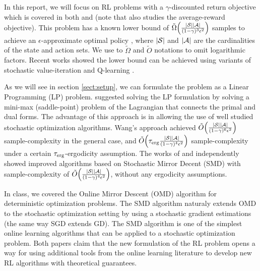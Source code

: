 \documentclass{article}
\DeclarePairedDelimiter\br{(}{)}%
\DeclarePairedDelimiter\abs{\lvert}{\rvert}%
\newcommand{\ntext}[1]{{\text{\normalfont#1}}}
\newcommand{\States}{\mathcal{S}}
\newcommand{\Actions}{\mathcal{A}}
\newcommand{\nSt}{{\abs{\States}}}
\newcommand{\nAct}{{\abs{\Actions}}}
\begin{document}
In this report, we will focus on RL problems with a  $\gamma$-discounted return objective which is covered in both \citet{cheng2020reduction}  and \citet{jin20efficiently}  (note that \citet{jin20efficiently} also studies the average-reward objective).
This problem has a known lower bound  of $\tilde{\Omega}\br*{\frac{\nSt \nAct}{(1-\gamma)^3 \epsilon^2}}$ samples to achieve an $\epsilon$-approximate optimal policy \citep{azar2012sample}, where $\nSt$ and $\nAct$ are the cardinalities  of the state and action sets. 
We use to $\tilde{\Omega}$ and $\tilde{O}$ notations to omit logarithmic factors.
Recent works showed the lower bound can be achieved using variants of stochastic value-iteration \citep{sidford2018near}  and Q-learning \citep{wainwright2019variance}.

As we will see in section \ref{sect:setup}, we can formulate the problem as a Linear Programming (LP) problem. 
\citet{wang2017randomized} suggested solving the LP formulation by solving a mini-max (saddle-point) problem of the Lagrangian that connects the primal and dual forms.
The advantage of this approach is in allowing the use of well studied stochastic optimization algorithms.  
Wang's approach achieved $\tilde{O}\br*{\frac{\nSt \nAct}{(1-\gamma)^6 \epsilon^2}}$ sample-complexity in the general case, and $\tilde{O}\br*{\tau_{\ntext{erg}} \frac{\nSt \nAct}{(1-\gamma)^4 \epsilon^2}}$ sample-complexity under a certain $\tau_{\ntext{erg}}$-ergodicity assumption.
The works of \citet{cheng2020reduction}  and \citet{jin20efficiently} independently showed improved algorithms based on Stochastic Mirror Decent (SMD) with sample-complexity of  $\tilde{O}\br*{ \frac{\nSt \nAct}{(1-\gamma)^4 \epsilon^2}}$, without any ergodicity assumptions.

In class, we covered the Online Mirror Descent (OMD) algorithm for deterministic optimization problems.
The SMD algorithm naturaly extends OMD to the stochastic optimization setting by using a stochastic gradient estimations (the same way SGD extends GD).
The SMD algorithm is one of the simplest online learning algorithms that can be applied to a stochastic optimization problem.
Both papers claim that the new formulation of the RL problem opens a way for using additional tools from the online learning literature to develop new RL algorithms with theoretical guarantees. 





\end{document}
